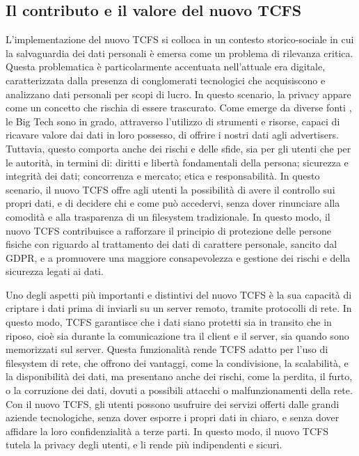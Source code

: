 \subsection{Il contributo e il valore del nuovo TCFS} 
L’implementazione del nuovo TCFS si colloca in un contesto storico-sociale in cui la salvaguardia dei dati personali è emersa come un problema di rilevanza critica. Questa problematica è particolarmente accentuata nell’attuale era digitale, caratterizzata dalla presenza di conglomerati tecnologici che acquisiscono e analizzano dati personali per scopi di lucro. In questo scenario, la privacy appare come un concetto che rischia di essere trascurato. Come emerge da diverse fonti \cite{4clegal} \cite{altalex1} \cite{altalex2} \cite{cybersecurity360}, le Big Tech sono in grado, attraverso l’utilizzo di strumenti e risorse, capaci di ricavare valore dai dati in loro possesso, di offrire i nostri dati agli advertisers. Tuttavia, questo comporta anche dei rischi e delle sfide, sia per gli utenti che per le autorità, in termini di: diritti e libertà fondamentali della persona; sicurezza e integrità dei dati; concorrenza e mercato; etica e responsabilità.
In questo scenario, il nuovo TCFS offre agli utenti la possibilità di avere il controllo sui propri dati, e di decidere chi e come può accedervi, senza dover rinunciare alla comodità e alla trasparenza di un filesystem tradizionale. In questo modo, il nuovo TCFS contribuisce a rafforzare il principio di protezione delle persone fisiche con riguardo al trattamento dei dati di carattere personale, sancito dal GDPR, e a promuovere una maggiore consapevolezza e gestione dei rischi e della sicurezza legati ai dati.

Uno degli aspetti più importanti e distintivi del nuovo TCFS è la sua capacità di criptare i dati prima di inviarli su un server remoto, tramite protocolli di rete. In questo modo, TCFS garantisce che i dati siano protetti sia in transito che in riposo, cioè sia durante la comunicazione tra il client e il server, sia quando sono memorizzati sul server. Questa funzionalità rende TCFS adatto per l’uso di filesystem di rete, che offrono dei vantaggi, come la condivisione, la scalabilità, e la disponibilità dei dati, ma presentano anche dei rischi, come la perdita, il furto, o la corruzione dei dati, dovuti a possibili attacchi o malfunzionamenti della rete. Con il nuovo TCFS, gli utenti possono usufruire dei servizi offerti dalle grandi aziende tecnologiche, senza dover esporre i propri dati in chiaro, e senza dover affidare la loro confidenzialità a terze parti. In questo modo, il nuovo TCFS tutela la privacy degli utenti, e li rende più indipendenti e sicuri.

